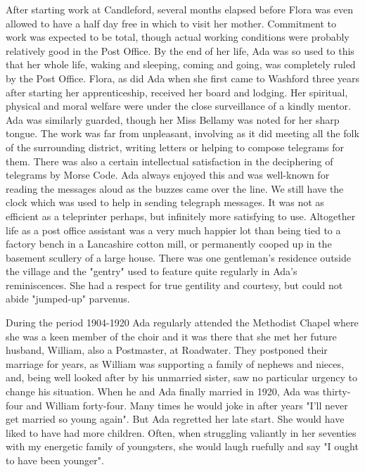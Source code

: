 After starting work at Candleford, several months elapsed before Flora was even allowed to have a half day free in which to visit her mother. Commitment to work was expected to be total, though actual working conditions were probably relatively good in the Post Office. By the end of her life, Ada was so used to this that her whole life, waking and sleeping, coming and going, was completely ruled by the Post Office. Flora, as did Ada when she first came to Washford three years after starting her apprenticeship, received her board and lodging. Her spiritual, physical and moral welfare were under the close surveillance of a kindly mentor. Ada was similarly guarded, though her Miss Bellamy was noted for her sharp tongue. The work was far from unpleasant, involving as it did meeting all the folk of the surrounding district, writing letters or helping to compose telegrams for them. There was also a certain intellectual satisfaction in the deciphering of telegrams by Morse Code. Ada always enjoyed this and was well-known for reading the messages aloud as the buzzes came over the line. We still have the clock which was used to help in sending telegraph messages. It was not as efficient as a teleprinter perhaps, but infinitely more satisfying to use. Altogether life as a post office assistant was a very much happier lot than being tied to a factory bench in a Lancashire cotton mill, or permanently cooped up in the basement scullery of a large house. There was one gentleman's residence outside the village and the "gentry" used to feature quite regularly in Ada's reminiscences. She had a respect for true gentility and courtesy, but could not abide "jumped-up" parvenus.

During the period 1904-1920 Ada regularly attended the Methodist Chapel where she was a keen member of the choir and it was there that she met her future husband, William, also a Postmaster, at Roadwater. They postponed their marriage for years, as William was supporting a family of nephews and nieces, and, being well looked after by his unmarried sister, saw no particular urgency to change his situation. When he and Ada finally married in 1920, Ada was thirty-four and William forty-four. Many times he would joke in after years "I'll never get married so young again". But Ada regretted her late start. She would have liked to have had more children. Often, when struggling valiantly in her seventies with my energetic family of youngsters, she would laugh ruefully and say "I ought to have been younger".

